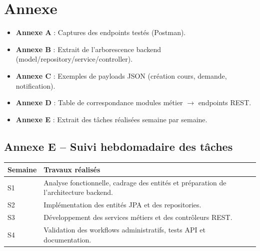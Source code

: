\chapter*{Annexe}

\begin{itemize}
  \item \textbf{Annexe A} : Captures des endpoints testés (Postman).
  \item \textbf{Annexe B} : Extrait de l'arborescence backend (model/repository/service/controller).
  \item \textbf{Annexe C} : Exemples de payloads JSON (création cours, demande, notification).
  \item \textbf{Annexe D} : Table de correspondance modules métier $\rightarrow$ endpoints REST.
  \item \textbf{Annexe E} : Extrait des tâches réalisées semaine par semaine.
\end{itemize}

\section*{Annexe E -- Suivi hebdomadaire des tâches}
\begin{tabularx}{\textwidth}{lX}
\toprule
\textbf{Semaine} & \textbf{Travaux réalisés} \\
\midrule
S1 & Analyse fonctionnelle, cadrage des entités et préparation de l'architecture backend. \\
S2 & Implémentation des entités JPA et des repositories. \\
S3 & Développement des services métiers et des contrôleurs REST. \\
S4 & Validation des workflows administratifs, tests API et documentation. \\
\bottomrule
\end{tabularx}
